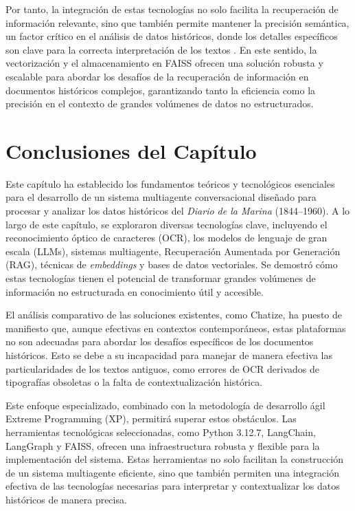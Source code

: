 Por tanto, la integración de estas tecnologías no solo facilita la recuperación de información relevante, sino que también permite mantener la precisión semántica, un factor crítico en el análisis de datos históricos, donde los detalles específicos son clave para la correcta interpretación de los textos \cite{mikolov2013efficient}. En este sentido, la vectorización y el almacenamiento en FAISS ofrecen una solución robusta y escalable para abordar los desafíos de la recuperación de información en documentos históricos complejos, garantizando tanto la eficiencia como la precisión en el contexto de grandes volúmenes de datos no estructurados.


\section*{Conclusiones del Capítulo}

Este capítulo ha establecido los fundamentos teóricos y tecnológicos esenciales para el desarrollo de un sistema multiagente conversacional diseñado para procesar y analizar los datos históricos del \textit{Diario de la Marina} (1844--1960). A lo largo de este capítulo, se exploraron diversas tecnologías clave, incluyendo el reconocimiento óptico de caracteres (OCR), los modelos de lenguaje de gran escala (LLMs), sistemas multiagente, Recuperación Aumentada por Generación (RAG), técnicas de \textit{embeddings} y bases de datos vectoriales. Se demostró cómo estas tecnologías tienen el potencial de transformar grandes volúmenes de información no estructurada en conocimiento útil y accesible.

El análisis comparativo de las soluciones existentes, como Chatize, ha puesto de manifiesto que, aunque efectivas en contextos contemporáneos, estas plataformas no son adecuadas para abordar los desafíos específicos de los documentos históricos. Esto se debe a su incapacidad para manejar de manera efectiva las particularidades de los textos antiguos, como errores de OCR derivados de tipografías obsoletas o la falta de contextualización histórica.

Este enfoque especializado, combinado con la metodología de desarrollo ágil Extreme Programming (XP), permitirá superar estos obstáculos. Las herramientas tecnológicas seleccionadas, como Python 3.12.7, LangChain, LangGraph y FAISS, ofrecen una infraestructura robusta y flexible para la implementación del sistema. Estas herramientas no solo facilitan la construcción de un sistema multiagente eficiente, sino que también permiten una integración efectiva de las tecnologías necesarias para interpretar y contextualizar los datos históricos de manera precisa.

